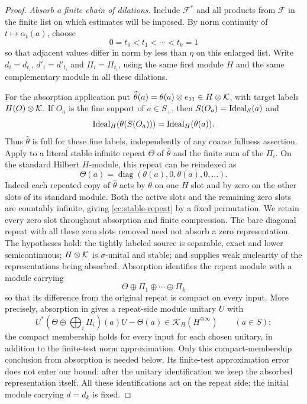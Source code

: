 \begin{proof}
\smallskip\noindent\emph{Absorb a finite chain of dilations.} 
Include $\mathcal F^*$ and all products from $\mathcal F$ in the
finite list on which estimates will be imposed.  By norm continuity
of $t\mapsto\alpha_t(a)$, choose
\[
 0=t_0<t_1<\cdots<t_k=1
\]
so that adjacent values differ in norm by less than $\eta$ on
this enlarged list.  Write $d_i=d_{t_i}$, $d'_i=d'_{t_i}$ and
$\Pi_i=\Pi_{t_i}$, using the same first module $H$ and the same
complementary module in all these dilations.

For the absorption application put
$\widehat\theta(a)=\theta(a)\otimes e_{11}\in H\otimes\mathcal K$,
with target labels $H(O)\otimes\mathcal K$.
If $O_a$ is the fine support of $a\in S_+$, then
$S(O_a)=\operatorname{Ideal}_S(a)$ and
\[
 \operatorname{Ideal}_H(\theta(S(O_a)))=\operatorname{Ideal}_H(\theta(a)).
\]
Thus $\widehat\theta$ is full for these fine labels, independently
of any coarse fullness assertion.  Apply 
to a literal stable infinite repeat $\Theta$ of
$\widehat\theta$ and the finite sum of the $\Pi_i$.
On the standard Hilbert $H$-module, this repeat can be reindexed as
\begin{equation}\label{cc:stable-repeat}
 \Theta(a)=\operatorname{diag}
       (\theta(a),0,\theta(a),0,\ldots).
\end{equation}
Indeed each repeated copy of $\widehat\theta$ acts by $\theta$
on one $H$ slot and by zero on the other slots of its standard
module.  Both the active slots and the remaining zero slots are
countably infinite, giving \eqref{cc:stable-repeat} by a fixed
permutation.  We retain every zero slot throughout absorption and
finite compression.  The bare diagonal repeat with all these zero
slots removed need not absorb a zero representation.
The hypotheses hold: the tightly labeled source is separable,
exact and lower semicontinuous; $H\otimes\mathcal K$ is $\sigma$-unital
and stable; and  supplies weak nuclearity
of the representations being absorbed.  Absorption identifies
the repeat module with a module carrying
\[
 \Theta\oplus\Pi_1\oplus\cdots\oplus\Pi_k
\]
so that its difference from the original repeat is compact on
every input.  More precisely, absorption in
\cite[Definition~5.4]{Gabe} gives a repeat-side module unitary $U$
with
\[
 U^*(\Theta\oplus\textstyle\bigoplus_i\Pi_i)(a)U-\Theta(a)
 \in\mathcal K_H(H^{\oplus\infty})\qquad(a\in S);
\]
the compact membership holds for every input for each chosen
unitary, in addition to the finite-test norm approximation.
Only this compact-membership conclusion from absorption is needed
below.  Its finite-test approximation error does not enter our bound:
after the unitary identification we keep the absorbed representation
itself.  All these identifications act on the repeat side; the initial
module carrying $d=d_k$ is fixed.


\end{proof}
